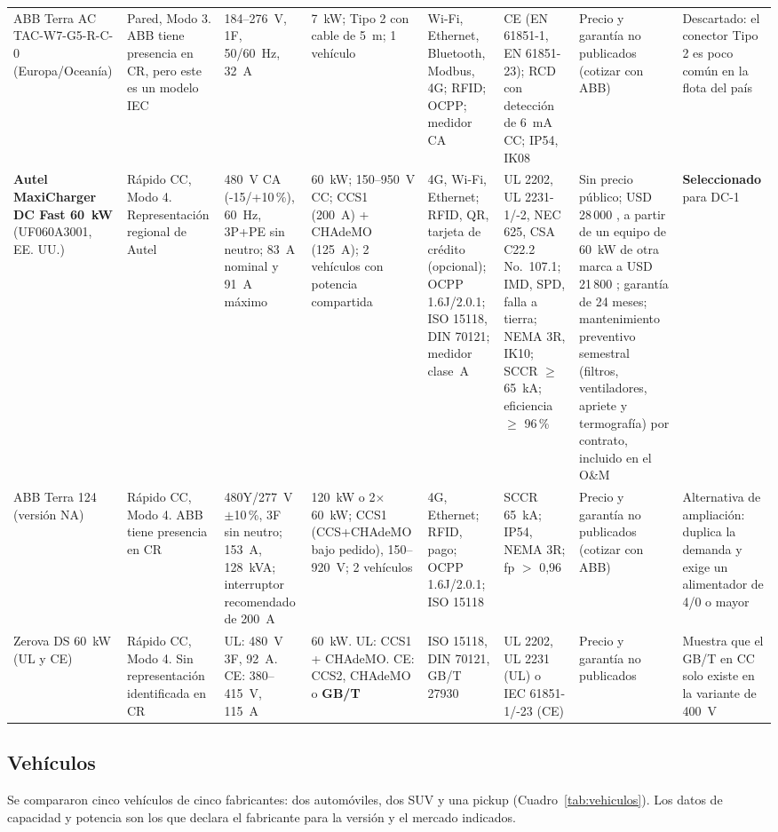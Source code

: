 \begin{landscape}
{\begin{longtable}{L{2.6cm}L{2.0cm}L{2.6cm}L{2.8cm}L{3.3cm}L{3.6cm}L{3.0cm}L{2.6cm}}
ABB Terra AC TAC-W7-G5-R-C-0 (Europa/Oceanía) & Pared, Modo 3. ABB tiene presencia en CR, pero este es un modelo IEC & 184--276~V, 1F, 50/60~Hz, 32~A & 7~kW; Tipo 2 con cable de 5~m; 1 vehículo & Wi-Fi, Ethernet, Bluetooth, Modbus, 4G; RFID; OCPP; medidor CA & CE (EN 61851-1, EN 61851-23); RCD con detección de 6~mA CC; IP54, IK08 & Precio y garantía no publicados (cotizar con ABB) & Descartado: el conector Tipo 2 es poco común en la flota del país \cite{abbTAC}\\
\textbf{Autel MaxiCharger DC Fast 60~kW} (UF060A3001, EE. UU.) & Rápido CC, Modo 4. Representación regional de Autel \supuesto{} & 480~V CA (-15/+10\,\%), 60~Hz, 3P+PE sin neutro; 83~A nominal y 91~A máximo & 60~kW; 150--950~V CC; CCS1 (200~A) + CHAdeMO (125~A); 2 vehículos con potencia compartida & 4G, Wi-Fi, Ethernet; RFID, QR, tarjeta de crédito (opcional); OCPP 1.6J/2.0.1; ISO 15118, DIN 70121; medidor clase~A & UL 2202, UL 2231-1/-2, NEC 625, CSA C22.2 No.~107.1; IMD, SPD, falla a tierra; NEMA 3R, IK10; SCCR $\ge$ 65~kA; eficiencia $\ge$ 96\,\% & Sin precio público; USD 28\,000 \supuesto{}, a partir de un equipo de 60~kW de otra marca a USD 21\,800 \cite{topdon}; garantía de 24 meses; mantenimiento preventivo semestral (filtros, ventiladores, apriete y termografía) por contrato, incluido en el O\&M & \textbf{Seleccionado} para DC-1\\
ABB Terra 124 (versión NA) & Rápido CC, Modo 4. ABB tiene presencia en CR & 480Y/277~V $\pm$10\,\%, 3F sin neutro; 153~A, 128~kVA; interruptor recomendado de 200~A & 120~kW o 2$\times$60~kW; CCS1 (CCS+CHAdeMO bajo pedido), 150--920~V; 2 vehículos & 4G, Ethernet; RFID, pago; OCPP 1.6J/2.0.1; ISO 15118 & SCCR 65~kA; IP54, NEMA 3R; fp $>$ 0,96 & Precio y garantía no publicados (cotizar con ABB) & Alternativa de ampliación: duplica la demanda y exige un alimentador de 4/0 o mayor \cite{abbTerra124}\\
Zerova DS 60~kW (UL y CE) & Rápido CC, Modo 4. Sin representación identificada en CR & UL: 480~V 3F, 92~A. CE: 380--415~V, 115~A & 60~kW. UL: CCS1 + CHAdeMO. CE: CCS2, CHAdeMO o \textbf{GB/T} & ISO 15118, DIN 70121, GB/T 27930 & UL 2202, UL 2231 (UL) o IEC 61851-1/-23 (CE) & Precio y garantía no publicados & Muestra que el GB/T en CC solo existe en la variante de 400~V \cite{zerova}\\
\bottomrule
\end{longtable}}
\end{landscape}

\subsection{Vehículos}
Se compararon cinco vehículos de cinco fabricantes: dos automóviles, dos SUV y una pickup (Cuadro~\ref{tab:vehiculos}). Los datos de capacidad y potencia son los que declara el fabricante para la versión y el mercado indicados.

